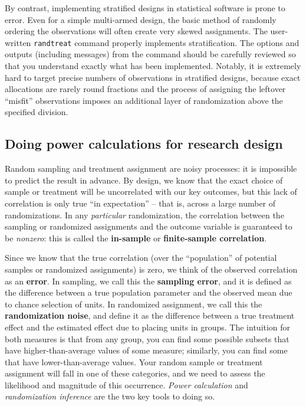 By contrast, implementing stratified designs in statistical software is prone to error.
Even for a simple multi-armed design,
the basic method of randomly ordering the observations
will often create very skewed assignments.
The user-written \texttt{randtreat} command properly implements stratification.
The options and outputs (including messages) from the command should be carefully reviewed
so that you understand exactly what has been implemented.
Notably, it is extremely hard to target precise numbers of observations
in stratified designs, because exact allocations are rarely round fractions
and the process of assigning the leftover ``misfit'' observations
imposes an additional layer of randomization above the specified division.


\subsection{Doing power calculations for research design}

Random sampling and treatment assignment are noisy processes:
it is impossible to predict the result in advance.
By design, we know that the exact choice of sample or treatment
will be uncorrelated with our key outcomes,
but this lack of correlation is only true ``in expectation'' --
that is, across a large number of randomizations.
In any \textit{particular} randomization,
the correlation between the sampling or randomized assignments and the outcome variable
is guaranteed to be \textit{nonzero}:
this is called the \textbf{in-sample} or \textbf{finite-sample correlation}.

Since we know that the true correlation
(over the ``population'' of potential samples or randomized assignments)
is zero, we think of the observed correlation as an \textbf{error}.
In sampling, we call this the \textbf{sampling error},
and it is defined as the difference between a true population parameter
and the observed mean due to chance selection of units.
In randomized assignment, we call this the \textbf{randomization noise},
and define it as the difference between a true treatment effect
and the estimated effect due to placing units in groups.
The intuition for both measures is that from any group,
you can find some possible subsets that have higher-than-average values of some measure;
similarly, you can find some that have lower-than-average values.
Your random sample or treatment assignment will fall in one of these categories,
and we need to assess the likelihood and magnitude of this occurrence.
\textit{Power calculation} and \textit{randomization inference} are the two key tools to doing so.

